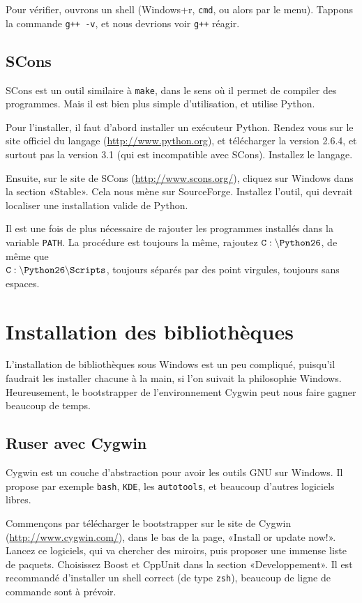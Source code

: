 	Pour vérifier, ouvrons un shell (Windows+r, {\tt cmd}, ou alors par le menu). Tappons la commande {\tt g++ -v}, et nous devrions voir {\tt g++} réagir.
\subsection{SCons}
SCons est un outil similaire à {\tt make}, dans le sens où il permet de compiler des programmes. Mais il est bien plus simple d'utilisation, et utilise Python.

Pour l'installer, il faut d'abord installer un exécuteur Python. Rendez vous sur le site officiel du langage (\url{http://www.python.org}), et télécharger la version 2.6.4, et surtout pas la version 3.1 (qui est incompatible avec SCons). Installez le langage.	

Ensuite, sur le site de SCons (\url{http://www.scons.org/}), cliquez sur Windows dans la section «Stable». Cela nous mène sur SourceForge. Installez l'outil, qui devrait localiser une installation valide de Python.

Il est une fois de plus nécessaire de rajouter les programmes installés dans la variable {\tt PATH}. La procédure est toujours la même, rajoutez {$\tt C:\backslash{}Python26$}, de même que \\{$\tt C:\backslash{}Python26\backslash{}Scripts$}, toujours séparés par des point virgules, toujours sans espaces.
\section{Installation des bibliothèques}
L'installation de bibliothèques sous Windows est un peu compliqué, puisqu'il faudrait les installer chacune à la main, si l'on suivait la philosophie Windows. Heureusement, le bootstrapper de l'environnement Cygwin peut nous faire gagner beaucoup de temps.
\subsection{Ruser avec Cygwin}
Cygwin est un couche d'abstraction pour avoir les outils GNU sur Windows. Il propose par exemple {\tt bash}, {\tt KDE}, les {\tt autotools}, et beaucoup d'autres logiciels libres.

Commençons par télécharger le bootstrapper sur le site de Cygwin (\url{http://www.cygwin.com/}), dans le bas de la page, «Install or update now!». Lancez ce logiciels, qui va chercher des miroirs, puis proposer une immense liste de paquets. Choisissez Boost et CppUnit dans la section «Developpement». Il est recommandé d'installer un shell correct (de type {\tt zsh}), beaucoup de ligne de commande sont à prévoir.


